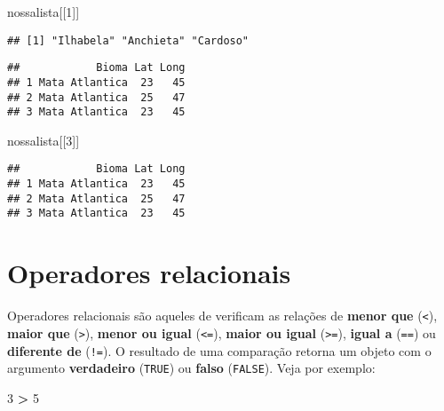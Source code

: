 \documentclass[
]{book}
\newenvironment{Shaded}{\begin{snugshade}}{\end{snugshade}}
\newcommand{\DecValTok}[1]{\textcolor[rgb]{0.00,0.00,0.81}{#1}}
\newcommand{\NormalTok}[1]{#1}
\newcommand{\OperatorTok}[1]{\textcolor[rgb]{0.81,0.36,0.00}{\textbf{#1}}}
\newcommand{\StringTok}[1]{\textcolor[rgb]{0.31,0.60,0.02}{#1}}
\begin{document}
\begin{Shaded}
\begin{Highlighting}[]
\NormalTok{nossalista[[}\DecValTok{1}\NormalTok{]]}
\end{Highlighting}
\end{Shaded}

\begin{verbatim}
## [1] "Ilhabela" "Anchieta" "Cardoso"
\end{verbatim}

\begin{Shaded}
\end{Shaded}

\begin{verbatim}
##            Bioma Lat Long
## 1 Mata Atlantica  23   45
## 2 Mata Atlantica  25   47
## 3 Mata Atlantica  23   45
\end{verbatim}

\begin{Shaded}
\begin{Highlighting}[]
\NormalTok{nossalista[[}\DecValTok{3}\NormalTok{]]}
\end{Highlighting}
\end{Shaded}

\begin{verbatim}
##            Bioma Lat Long
## 1 Mata Atlantica  23   45
## 2 Mata Atlantica  25   47
## 3 Mata Atlantica  23   45
\end{verbatim}

\hypertarget{operadores-relacionais}{%
\section{Operadores relacionais}\label{operadores-relacionais}}

Operadores relacionais são aqueles de verificam as relações de \textbf{menor que} (\texttt{\textless{}}), \textbf{maior que} (\texttt{\textgreater{}}), \textbf{menor ou igual} (\texttt{\textless{}=}), \textbf{maior ou igual} (\texttt{\textgreater{}=}), \textbf{igual a} (\texttt{==}) ou \textbf{diferente de} (\texttt{!=}). O resultado de uma comparação retorna um objeto com o argumento \textbf{verdadeiro} (\texttt{TRUE}) ou \textbf{falso} (\texttt{FALSE}). Veja por exemplo:

\begin{Shaded}
\begin{Highlighting}[]
\DecValTok{3} \OperatorTok{>}\StringTok{ }\DecValTok{5}
\end{Highlighting}
\end{Shaded}
\end{document}
